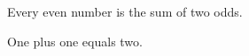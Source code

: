\documentclass{article}
\begin{document}
\begin{thm}
Every even number is the sum of two odds.
\end{thm}
\begin{lem}
One plus one equals two.
\end{lem}
\end{document}
